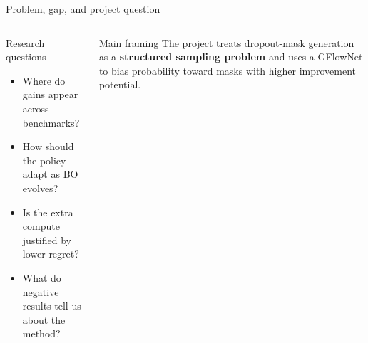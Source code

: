 \documentclass[aspectratio=169]{beamer}
\begin{document}
\begin{frame}{Problem, gap, and project question}
\begin{columns}[T,onlytextwidth]
\begin{minipage}[t][0.80\textheight]{\linewidth}
  \vfill

  \begin{card}{Research questions}
  \begin{itemize}
    \item Where do gains appear across benchmarks?
    \item How should the policy adapt as BO evolves?
    \item Is the extra compute justified by lower regret?
    \item What do negative results tell us about the method?
  \end{itemize}
  \end{card}

  \vfill

  \begin{card}{Main framing}
  The project treats dropout-mask generation as a \textbf{structured sampling problem} and uses a GFlowNet to bias probability toward masks with higher improvement potential.
  \end{card}
\end{minipage}
\end{columns}
\end{frame}
\end{document}
